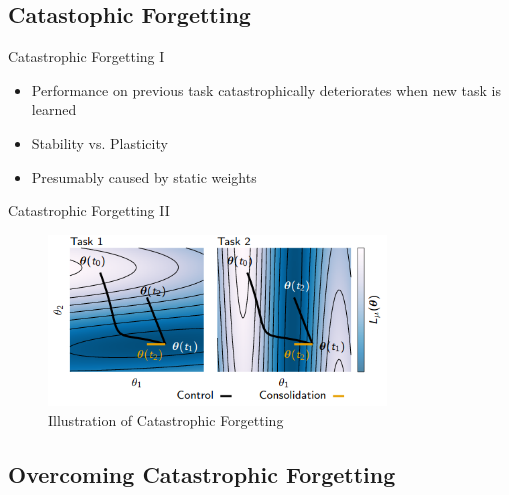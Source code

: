 \documentclass{beamer}
\begin{document}
\subsection{Catastophic Forgetting}
\begin{frame}{Catastrophic Forgetting I}
	\begin{itemize}
		\item<1-> Performance on previous task catastrophically deteriorates when new task is learned
		\item<2-> Stability vs. Plasticity	
		\item<3-> Presumably caused by static weights
\end{itemize}
\begin{center}
\end{center}
\end{frame}

\begin{frame}{Catastrophic Forgetting II}
	\begin{figure}
	
	\centering
	\includegraphics[width=0.8\textwidth]{ML1}
	\caption{Illustration of Catastrophic Forgetting \cite{zenke2017continual}}
\end{figure}
\end{frame}
\subsection{Overcoming Catastrophic Forgetting}
\end{document}

